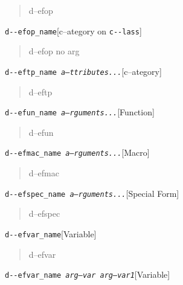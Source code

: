 \documentclass{book}
\begin{document}
%
\begin{quote}
\unskip{\parskip=0pt\noindent}%
d--efop
\end{quote}

\noindent\texttt{d{-}{-}efop\_name}\hfill[c--ategory on \texttt{c{-}{-}lass}]

%
\begin{quote}
\unskip{\parskip=0pt\noindent}%
d--efop no arg
\end{quote}

\noindent\texttt{d{-}{-}eftp\_name \EmbracOn{}\textnormal{\textsl{a--ttributes...}}\EmbracOff{}}\hfill[c--ategory]

%
\begin{quote}
\unskip{\parskip=0pt\noindent}%
d--eftp
\end{quote}

\noindent\texttt{d{-}{-}efun\_name \EmbracOn{}\textnormal{\textsl{a--rguments...}}\EmbracOff{}}\hfill[Function]

%
\begin{quote}
\unskip{\parskip=0pt\noindent}%
d--efun
\end{quote}

\noindent\texttt{d{-}{-}efmac\_name \EmbracOn{}\textnormal{\textsl{a--rguments...}}\EmbracOff{}}\hfill[Macro]

%
\begin{quote}
\unskip{\parskip=0pt\noindent}%
d--efmac
\end{quote}

\noindent\texttt{d{-}{-}efspec\_name \EmbracOn{}\textnormal{\textsl{a--rguments...}}\EmbracOff{}}\hfill[Special Form]

%
\begin{quote}
\unskip{\parskip=0pt\noindent}%
d--efspec
\end{quote}

\noindent\texttt{d{-}{-}efvar\_name}\hfill[Variable]

%
\begin{quote}
\unskip{\parskip=0pt\noindent}%
d--efvar
\end{quote}

\noindent\texttt{d{-}{-}efvar\_name \EmbracOn{}\textnormal{\textsl{arg--var arg--var1}}\EmbracOff{}}\hfill[Variable]
\end{document}
